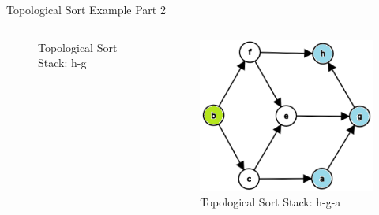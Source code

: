 \documentclass[aspectratio=169]{beamer}%
\begin{document}
\begin{frame}{Topological Sort Example Part 2}
\begin{columns}
\begin{column}{.32\textwidth}
\begin{figure}
                \caption{Topological Sort Stack: h-g}
            \end{figure}                
        \end{column}
        \hfill
        \begin{column}{.32\textwidth}
            \begin{figure}
                \centering
                \includegraphics[width = .9\linewidth]{topsort6.png}
                \caption{Topological Sort Stack: h-g-a}
            \end{figure}
        \end{column}
    \end{columns}
\end{frame}
\end{document}
